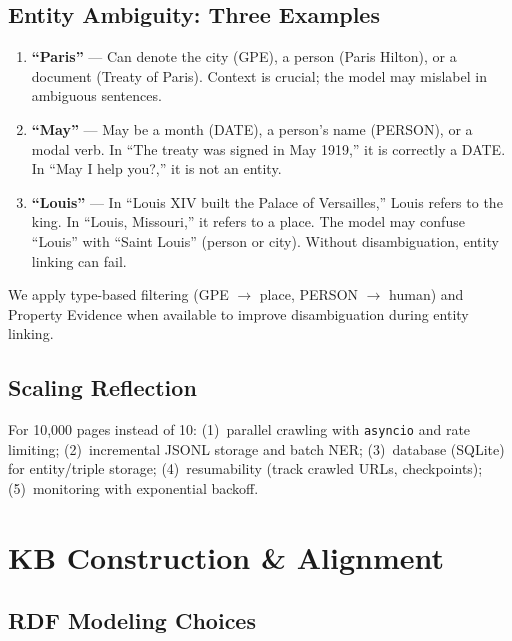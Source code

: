 \documentclass[11pt,a4paper]{article}
\begin{document}
\subsection{Entity Ambiguity: Three Examples}

\begin{enumerate}
\item \textbf{``Paris''} --- Can denote the city (GPE), a person (Paris Hilton), or a document (Treaty of Paris). Context is crucial; the model may mislabel in ambiguous sentences.

\item \textbf{``May''} --- May be a month (DATE), a person's name (PERSON), or a modal verb. In ``The treaty was signed in May 1919,'' it is correctly a DATE. In ``May I help you?,'' it is not an entity.

\item \textbf{``Louis''} --- In ``Louis XIV built the Palace of Versailles,'' Louis refers to the king. In ``Louis, Missouri,'' it refers to a place. The model may confuse ``Louis'' with ``Saint Louis'' (person or city). Without disambiguation, entity linking can fail.
\end{enumerate}

We apply type-based filtering (GPE $\rightarrow$ place, PERSON $\rightarrow$ human) and Property Evidence when available to improve disambiguation during entity linking.

\subsection{Scaling Reflection}

For 10,000 pages instead of 10: (1)~parallel crawling with \texttt{asyncio} and rate limiting; (2)~incremental JSONL storage and batch NER; (3)~database (SQLite) for entity/triple storage; (4)~resumability (track crawled URLs, checkpoints); (5)~monitoring with exponential backoff.

\section{KB Construction \& Alignment}

\subsection{RDF Modeling Choices}
\end{document}
